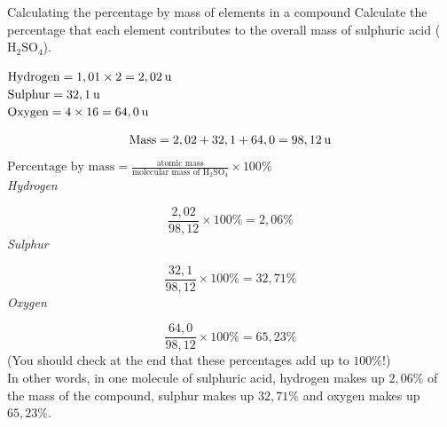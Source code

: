       \begin{wex}{Calculating the percentage by mass of elements in a compound }
{
      \label{m38712*probfhsst!!!underscore!!!id902}
      \label{m38712*id280520}Calculate the percentage that each element contributes to the overall mass of sulphuric acid (${\text{H}}_{2}{\text{SO}}_{4}$).
      }
{
      \label{m38712*id280575}$\text{Hydrogen}=1,01\ensuremath{\times}2=2,02\phantom{\rule{2pt}{0ex}}\text{u}$ \\ 
      \label{m38712*id280588}$\text{Sulphur}=32,1\phantom{\rule{2pt}{0ex}}\text{u}$ \\
      \label{m38712*id280591}$\text{Oxygen}=4\ensuremath{\times}16=64,0\phantom{\rule{2pt}{0ex}}\text{u}$
      \label{m38712*id280629}\nopagebreak\noindent{}
        
    \begin{equation*}
    \text{Mass}=2,02 + 32,1 + 64,0 =98,12\phantom{\rule{2pt}{0ex}}\text{u}
      \end{equation*}
      \label{m38712*id280688}$\text{Percentage by mass}=\frac{\text{atomic mass}}{\text{molecular mass of H}{}_{2}\text{SO}{}_{4}}\ensuremath{\times}100\%$ \\
      \label{m38712*id280729}
        \textsl{Hydrogen}
      
      \label{m38712*id280735}\nopagebreak\noindent{}
        
    \begin{equation*}
    \frac{2,02}{98,12}\ensuremath{\times}100\%=2,06\%
      \end{equation*}
      \label{m38712*id280780}
        \textsl{Sulphur}
      
      \label{m38712*id280786}\nopagebreak\noindent{}
        
    \begin{equation*}
    \frac{32,1}{98,12}\ensuremath{\times}100\%=32,71\%
      \end{equation*}
      \label{m38712*id280831}
        \textsl{Oxygen}
      
      \label{m38712*id280837}\nopagebreak\noindent{}
        
    \begin{equation*}
    \frac{64,0}{98,12}\ensuremath{\times}100\%=65,23\%
      \end{equation*}
      \label{m38712*id280876}(You should check at the end that these percentages add up to $100\%$!) \\
      \label{m38712*id280880}In other words, in one molecule of sulphuric acid, hydrogen makes up $2,06\%$ of the mass of the compound, sulphur makes up $32,71\%$ and oxygen makes up $65,23\%$. 
}
    \end{wex}
